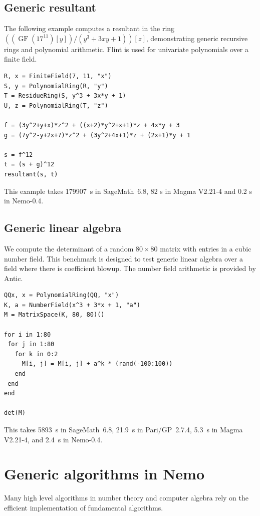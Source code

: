 \documentclass{sig-alternate-05-2015}
\begin{document}
\subsection{Generic resultant}

The following example computes a resultant
in the ring $((\operatorname{GF}(17^{11})[y])/(y^3 + 3xy + 1))[z]$,
demonstrating generic recursive rings and polynomial
arithmetic. Flint is used for univariate polynomials over a finite field.

\begin{verbatim}
R, x = FiniteField(7, 11, "x")
S, y = PolynomialRing(R, "y")
T = ResidueRing(S, y^3 + 3x*y + 1)
U, z = PolynomialRing(T, "z")

f = (3y^2+y+x)*z^2 + ((x+2)*y^2+x+1)*z + 4x*y + 3
g = (7y^2-y+2x+7)*z^2 + (3y^2+4x+1)*z + (2x+1)*y + 1

s = f^12
t = (s + g)^12
resultant(s, t)
\end{verbatim}

This example takes 179907~s in SageMath~6.8, 82 s in Magma V2.21-4
and 0.2 s in Nemo-0.4.

\subsection{Generic linear algebra}

We compute the determinant of a random $80\times80$ matrix
with entries in a cubic number field.
This benchmark is designed to test generic linear algebra over a field
where there is coefficient blowup. The number field arithmetic is
provided by Antic.

\begin{verbatim}
QQx, x = PolynomialRing(QQ, "x")
K, a = NumberField(x^3 + 3*x + 1, "a")
M = MatrixSpace(K, 80, 80)()

for i in 1:80
 for j in 1:80
   for k in 0:2
     M[i, j] = M[i, j] + a^k * (rand(-100:100))
   end
 end
end

det(M)
\end{verbatim}

This takes 5893~s in SageMath~6.8, 21.9~s in Pari/GP~2.7.4, 5.3~s in Magma V2.21-4,
and 2.4~s in Nemo-0.4.

\section{Generic algorithms in Nemo}

Many high level algorithms in number theory and computer algebra rely on
the efficient implementation of fundamental algorithms.
\end{document}
